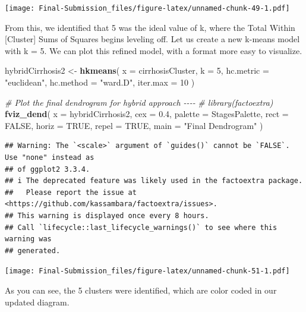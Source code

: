 \documentclass[
]{article}
\newenvironment{Shaded}{\begin{snugshade}}{\end{snugshade}}
\newcommand{\AttributeTok}[1]{\textcolor[rgb]{0.13,0.29,0.53}{#1}}
\newcommand{\CommentTok}[1]{\textcolor[rgb]{0.56,0.35,0.01}{\textit{#1}}}
\newcommand{\ConstantTok}[1]{\textcolor[rgb]{0.56,0.35,0.01}{#1}}
\newcommand{\DecValTok}[1]{\textcolor[rgb]{0.00,0.00,0.81}{#1}}
\newcommand{\FloatTok}[1]{\textcolor[rgb]{0.00,0.00,0.81}{#1}}
\newcommand{\FunctionTok}[1]{\textcolor[rgb]{0.13,0.29,0.53}{\textbf{#1}}}
\newcommand{\NormalTok}[1]{#1}
\newcommand{\OtherTok}[1]{\textcolor[rgb]{0.56,0.35,0.01}{#1}}
\newcommand{\StringTok}[1]{\textcolor[rgb]{0.31,0.60,0.02}{#1}}
\begin{document}
\texttt{[image: Final-Submission\_files/figure-latex/unnamed-chunk-49-1.pdf]}

From this, we identified that 5 was the ideal value of k, where the
Total Within {[}Cluster{]} Sums of Squares begins leveling off. Let us
create a new k-means model with k = 5. We can plot this refined model,
with a format more easy to visualize.

\begin{Shaded}
\begin{Highlighting}[]
\NormalTok{hybridCirrhosis2 }\OtherTok{\textless{}{-}} \FunctionTok{hkmeans}\NormalTok{(}
  \AttributeTok{x =}\NormalTok{ cirrhosisCluster,}
  \AttributeTok{k =} \DecValTok{5}\NormalTok{,}
  \AttributeTok{hc.metric =} \StringTok{"euclidean"}\NormalTok{,}
  \AttributeTok{hc.method =} \StringTok{"ward.D"}\NormalTok{,}
  \AttributeTok{iter.max =} \DecValTok{10}
\NormalTok{)}
\end{Highlighting}
\end{Shaded}

\begin{Shaded}
\begin{Highlighting}[]
\CommentTok{\# Plot the final dendrogram for hybrid approach {-}{-}{-}{-}}
\CommentTok{\# library(factoextra)}
\FunctionTok{fviz\_dend}\NormalTok{(}
  \AttributeTok{x =}\NormalTok{ hybridCirrhosis2,}
  \AttributeTok{cex =} \FloatTok{0.4}\NormalTok{,}
  \AttributeTok{palette =}\NormalTok{ StagesPalette,}
  \AttributeTok{rect =} \ConstantTok{FALSE}\NormalTok{,}
  \AttributeTok{horiz =} \ConstantTok{TRUE}\NormalTok{,}
  \AttributeTok{repel =} \ConstantTok{TRUE}\NormalTok{,}
  \AttributeTok{main =} \StringTok{"Final Dendrogram"}
\NormalTok{)}
\end{Highlighting}
\end{Shaded}

\begin{verbatim}
## Warning: The `<scale>` argument of `guides()` cannot be `FALSE`. Use "none" instead as
## of ggplot2 3.3.4.
## i The deprecated feature was likely used in the factoextra package.
##   Please report the issue at <https://github.com/kassambara/factoextra/issues>.
## This warning is displayed once every 8 hours.
## Call `lifecycle::last_lifecycle_warnings()` to see where this warning was
## generated.
\end{verbatim}

\texttt{[image: Final-Submission\_files/figure-latex/unnamed-chunk-51-1.pdf]}

As you can see, the 5 clusters were identified, which are color coded in
our updated diagram.
\end{document}
